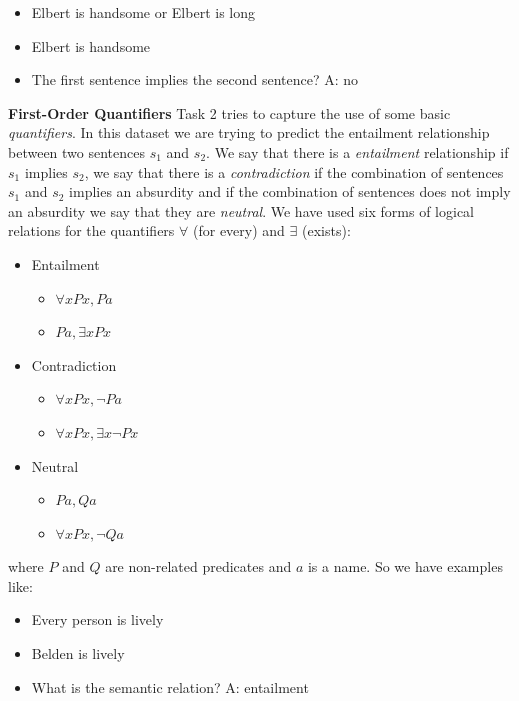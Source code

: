 \vspace{0.3cm}

\begin{itemize} 
\item[]Elbert is handsome or Elbert is long
\item[]Elbert is handsome
\item[]The first sentence implies the second sentence? A: no
\end{itemize}

\textbf{First-Order Quantifiers} Task 2 tries to capture the use of some basic \textit{quantifiers}. In this dataset we are trying to predict the entailment relationship between two sentences $s_1$ and $s_2$. We say that there is a \textit{entailment} relationship if $s_1$ implies $s_2$, we say that there is a \textit{contradiction} if the combination of sentences $s_1$ and $s_2$ implies an absurdity and if the combination of sentences does not imply an absurdity we say that they are \textit{neutral}. We have used six forms of logical relations for the quantifiers $\forall$ (for every) and $\exists$ (exists):

\begin{itemize}
\item Entailment
\begin{itemize}
\item $\forall x Px, Pa$ 
\item $Pa, \exists x Px$ 
\end{itemize}
\item Contradiction
\begin{itemize}
\item $\forall x Px, \lnot Pa$ 
\item $\forall x Px, \exists x \lnot Px$ 
\end{itemize}
\item Neutral
\begin{itemize}
\item $Pa,Qa$
\item $\forall x Px, \lnot Qa$ 
\end{itemize}
\end{itemize}

where $P$ and $Q$ are non-related predicates and $a$ is a name. So we have examples like:

\begin{itemize} 
\item[] Every person is lively
\item[] Belden is lively
\item[] What is the semantic relation? A: entailment
\end{itemize}

